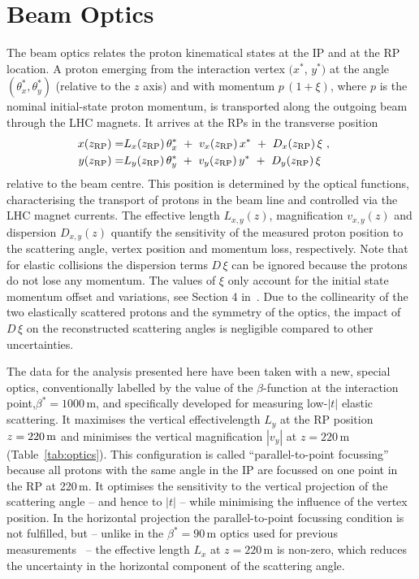 \section{Beam Optics}
\label{sec:beam optics}

\iffalse
The beam optics relates the proton kinematical states at the IP and at the RP location. A proton emerging from the interaction vertex $(x^*$, $y^*)$ at the angle $(\theta_x^*,\theta_y^*)$ (relative to the $z$ axis) and with momentum $p\,(1+\xi)$, where $p$ is the nominal initial-state proton momentum, is transported along the outgoing beam through the LHC magnets. It arrives at the RPs in the transverse position
\begin{equation}
\label{eq:prot trans}
	\begin{aligned}
		x(z_{\rm RP}) =& L_x(z_{\rm RP})\, \theta_x^*\ +\ v_x(z_{\rm RP})\, x^*\ +\ D_x(z_{\rm RP})\, \xi\ ,\cr
		y(z_{\rm RP}) =& L_y(z_{\rm RP})\, \theta_y^*\ +\ v_y(z_{\rm RP})\, y^*\ +\ D_y(z_{\rm RP})\, \xi \quad
	\end{aligned}
\end{equation}
relative to the beam centre. This position is determined by the optical functions, characterising the transport of protons in the beam line and controlled via 
the LHC magnet currents.
The effective length $L_{x,y}(z)$, magnification $v_{x,y}(z)$ and dispersion $D_{x,y}(z)$ quantify the sensitivity of the measured proton position to the 
scattering angle, vertex position and momentum loss, respectively.
Note that for elastic collisions the dispersion terms $D\,\xi$ can be ignored because the protons do not lose any momentum. The values of $\xi$ only account for the initial state momentum offset and variations, see Section 4 in~\cite{8tev-90m}. Due to the collinearity of the two elastically scattered protons and the symmetry of the optics, the impact of $D\,\xi$ on the reconstructed scattering angles is negligible compared to other uncertainties.

The data for the analysis presented here have been taken with a new, special optics, conventionally labelled by the value of the $\beta$-function at the interaction point,\Break $\beta^{*} = 1000\,$m, and specifically developed for measuring low-$|t|$ elastic scattering. It maximises the vertical effective\Break length $L_{y}$ at the RP position $z = 220\,{\rm m}$ and minimises the vertical magnification $|v_{y}|$ at $z = 220\,$m (Table~\ref{tab:optics}). This configuration is called
``parallel-to-point focussing'' because all protons with the same angle in the IP are focussed on one point in the RP at 220\,m. It optimises the sensitivity to the vertical projection of the scattering angle -- and hence to $|t|$ -- while minimising the influence of the vertex position. 
In the horizontal projection the parallel-to-point focussing condition is not fulfilled, but -- unlike in the $\beta^{*} = 90\,$m optics used for previous measurements~\cite{epl96,epl101-el,epl101-tot,prl111} -- the effective length $L_{x}$ at $z = 220\,$m is non-zero, which reduces the uncertainty in the horizontal component of the scattering angle.

